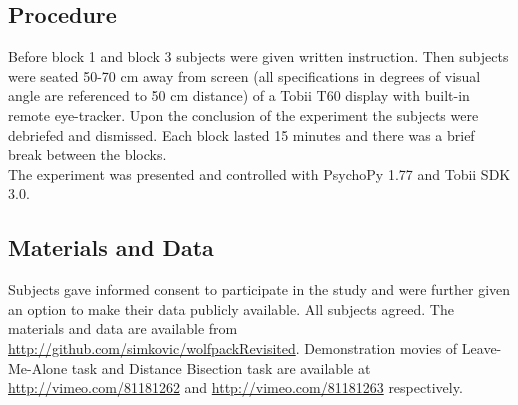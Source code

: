 \documentclass[10pt]{article}
\begin{document}
\subsection*{Procedure}
Before block 1 and block 3 subjects were given written instruction.
Then subjects were seated 50-70 cm away from screen (all specifications in degrees of visual angle are referenced to 50 cm distance) of a Tobii T60 display with built-in remote eye-tracker. 
Upon the conclusion of the experiment the subjects were debriefed and dismissed. 
Each block lasted 15 minutes and there was a brief break between the blocks.\\
The experiment was presented and controlled with PsychoPy 1.77 \cite{peirce07} and Tobii SDK 3.0. 

\subsection*{Materials and Data}
Subjects gave informed consent to participate in the study and were further given an option to make their data publicly available. 
All subjects agreed. 
The materials and data are available from\\ \url{http://github.com/simkovic/wolfpackRevisited}. Demonstration movies of Leave-Me-Alone task and Distance Bisection task are available at \url{http://vimeo.com/81181262} and \url{http://vimeo.com/81181263} respectively.
\end{document}
